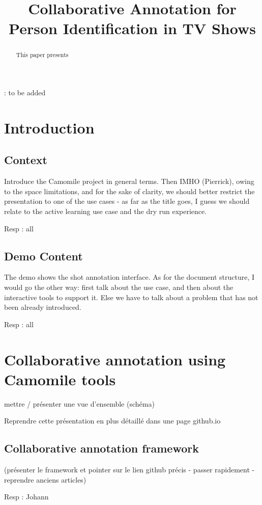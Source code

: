 \documentclass[a4paper]{article}
\title{Collaborative Annotation for Person Identification in TV Shows}
\begin{document}
  \maketitle
  \begin{abstract}
This paper presents 
  \end{abstract}
  : to be added

  \section{Introduction}
      \subsection{Context}
Introduce the Camomile project in general terms. Then IMHO (Pierrick), owing to the space limitations, and for the sake of clarity, we should better restrict the presentation to one of the use cases - as far as the title goes, I guess we should relate to the active learning use case and the dry run experience. 

Resp : all

 \subsection{Demo Content}
The demo shows the shot annotation interface. As for the document structure, I would go the other way: first talk about the use case, and then about the interactive tools to support it. Else we have to talk about a problem that has not been already introduced.

Resp : all

      \section{Collaborative annotation using Camomile tools}

mettre / présenter une vue d'ensemble (schéma) 

Reprendre cette présentation en plus détaillé dans une page github.io 


      \subsection{Collaborative annotation framework}
(présenter le framework et pointer sur le lien github précis - passer rapidement - reprendre anciens articles)

Resp : Johann
  
\end{document}
